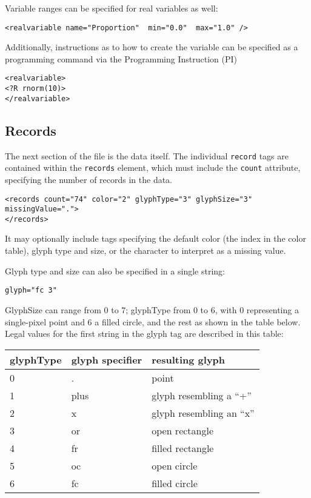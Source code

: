 \documentclass{article}
\begin{document}
Variable ranges can be specified for real variables as well:

\begin{verbatim}
<realvariable name="Proportion"  min="0.0"  max="1.0" />
\end{verbatim}



Additionally, instructions as to how to create the variable can be
specified as a programming command via the Programming Instruction (PI)
\begin{verbatim}
<realvariable>
<?R rnorm(10)>
</realvariable>
\end{verbatim}

\subsection{Records}

The next section of the file is the data itself.  The individual
\texttt{record} tags are contained within the \texttt{records}
element, which must include the \texttt{count} attribute, specifying
the number of records in the data.

\begin{verbatim}
<records count="74" color="2" glyphType="3" glyphSize="3" missingValue=".">
</records>
\end{verbatim}
%
It may optionally include tags specifying the default color (the
index in the color table), glyph type and size, or the character to
interpret as a missing value.

Glyph type and size can also be specified in a single string:
\begin{verbatim}
glyph="fc 3"
\end{verbatim}
GlyphSize can range from 0 to 7; glyphType from 0 to 6, with 0
representing a single-pixel point and 6 a filled circle, and
the rest as shown in the table below.  Legal values
for the first string in the glyph tag are described in this table:

\begin{tabular}{l|l|l}
glyphType & glyph specifier & resulting glyph \\
\hline
0 & .    & point \\
1 & plus & glyph resembling a ``+'' \\
2 & x    & glyph resembling an ``x'' \\
3 & or   & open rectangle \\
4 & fr   & filled rectangle \\
5 & oc   & open circle \\
6 & fc   & filled circle
\end{tabular}
\end{document}
